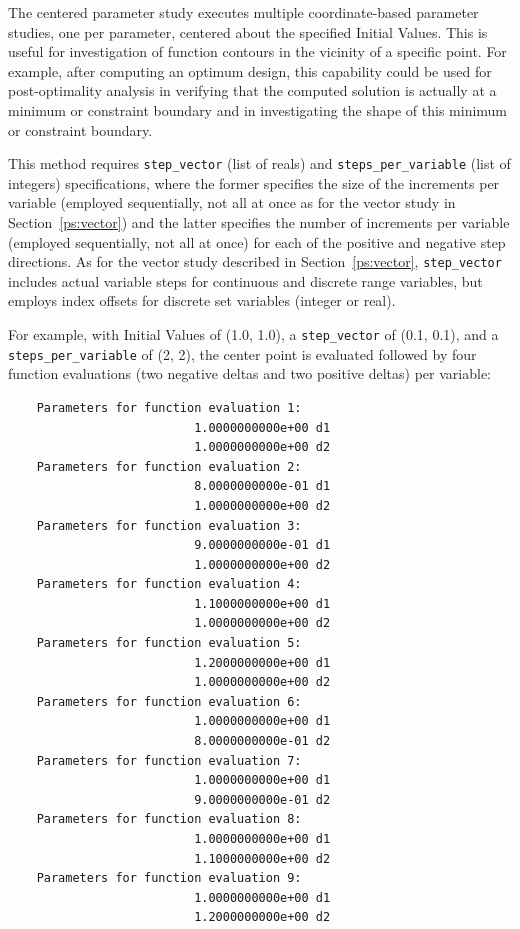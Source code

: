 The centered parameter study executes multiple coordinate-based
parameter studies, one per parameter, centered about the specified
Initial Values. This is useful for investigation of function contours
in the vicinity of a specific point. For example, after computing an
optimum design, this capability could be used for post-optimality
analysis in verifying that the computed solution is actually at a
minimum or constraint boundary and in investigating the shape of this
minimum or constraint boundary.

This method requires \texttt{step\_vector} (list of reals) and
\texttt{steps\_per\_variable} (list of integers) specifications, where 
the former specifies the size of the increments per variable (employed
sequentially, not all at once as for the vector study in
Section~\ref{ps:vector}) and the latter specifies the number of
increments per variable (employed sequentially, not all at once) for
each of the positive and negative step directions.  As for the vector
study described in Section~\ref{ps:vector}, \texttt{step\_vector}
includes actual variable steps for continuous and discrete range
variables, but employs index offsets for discrete set variables
(integer or real).

For example, with Initial Values of (1.0, 1.0), a \texttt{step\_vector} 
of (0.1, 0.1), and a \texttt{steps\_per\_variable} of (2, 2), the 
center point is evaluated followed by four function evaluations (two 
negative deltas and two positive deltas) per variable:
\begin{small}
\begin{verbatim}
    Parameters for function evaluation 1:
                          1.0000000000e+00 d1
                          1.0000000000e+00 d2
    Parameters for function evaluation 2:
                          8.0000000000e-01 d1
                          1.0000000000e+00 d2
    Parameters for function evaluation 3:
                          9.0000000000e-01 d1
                          1.0000000000e+00 d2
    Parameters for function evaluation 4:
                          1.1000000000e+00 d1
                          1.0000000000e+00 d2
    Parameters for function evaluation 5:
                          1.2000000000e+00 d1
                          1.0000000000e+00 d2
    Parameters for function evaluation 6:
                          1.0000000000e+00 d1
                          8.0000000000e-01 d2
    Parameters for function evaluation 7:
                          1.0000000000e+00 d1
                          9.0000000000e-01 d2
    Parameters for function evaluation 8:
                          1.0000000000e+00 d1
                          1.1000000000e+00 d2
    Parameters for function evaluation 9:
                          1.0000000000e+00 d1
                          1.2000000000e+00 d2
\end{verbatim}
\end{small}

